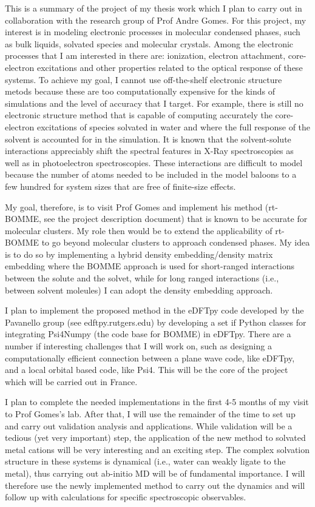 \documentclass[notitlepage,12pt]{report}
\begin{document}
This is a summary of the project of my thesis work which I plan to carry out in collaboration with the research group of Prof Andre Gomes. For this project, my interest is in modeling electronic processes in molecular condensed phases, such as bulk liquids, solvated species and molecular crystals. Among the electronic processes that I am interested in there are: ionization, electron attachment, core-electron excitations and other properties related to the optical response of these systems. To achieve my goal, I cannot use off-the-shelf electronic structure metods because these are too computationally expensive for the kinds of simulations and the level of accuracy that I target. For example, there is still no electronic structure method that is capable of computing accurately the core-electron excitations of species solvated in water and where the full response of the solvent is accounted for in the simulation. It is known that the solvent-solute interactions appreciably shift the spectral features in X-Ray spectroscopies as well as in photoelectron spectroscopies. These interactions are difficult to model because the number of atoms needed to be included in the model baloons to a few hundred for system sizes that are free of finite-size effects. 

My goal, therefore, is to visit Prof Gomes and implement his method (rt-BOMME, see the project description document) that is known to be accurate for molecular clusters. My role then would be to extend the applicability of rt-BOMME to go beyond molecular clusters to approach condensed phases. My idea is to do so by implementing a hybrid density embedding/density matrix embedding where the BOMME approach is used for short-ranged interactions between the solute and the solvet, while for long ranged interactions (i.e., between solvent moleules) I can adopt the density embedding approach. 

I plan to implement the proposed method in the eDFTpy code developed by the Pavanello group (see edftpy.rutgers.edu) by developing a set if Python classes for integrating Psi4Numpy (the code base for BOMME) in eDFTpy. There are a number if interesting challenges that I will work on, such as designing a computationally efficient connection between a plane wave code, like eDFTpy, and a local orbital based code, like Psi4. This will be the core of the project which will be carried out in France. 

I plan to complete the needed implementations in the first 4-5 months of my visit to Prof Gomes's lab. After that, I will use the remainder of the time to set up and carry out validation analysis and applications. While validation will be a tedious (yet very important) step, the application of the new method to solvated metal cations will be very interesting and an exciting step. The complex solvation structure in these systems is dynamical (i.e., water can weakly ligate to the metal), thus carrying out ab-initio MD will be of fundamental importance. I will therefore use the newly implemented method to carry out the dynamics and will follow up with calculations for specific spectroscopic observables. 
\end{document}
